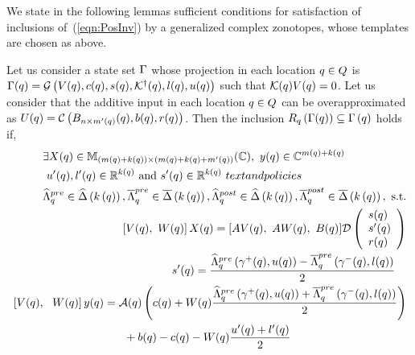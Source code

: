 We state in the following lemmas sufficient conditions for satisfaction of inclusions
of~(\ref{eqn:PosInv}) by a generalized complex zonotopes,
whose templates are chosen as above.
\begin{lemma}
  Let us consider a state set $\Gamma$ whose projection in each
  location $q\in Q$ is $\Gamma(q) =
  \mathcal{G}\left(V(q),c(q),s(q),\mathcal{K}^\dagger(q),l(q),u(q)\right)$
  such that $\mathcal{K}(q)V(q) = 0$.  Let us consider that the
  additive input in each location $q\in Q$ can be
  overapproximated as $U(q) = \mathcal{C}\left(B_{n\times
      m^\prime(q)}(q),b(q),r(q)\right)$.  Then the inclusion
  $R_{q}\left(\Gamma(q)\right) \subseteq
  \Gamma\left(q\right)$ holds if,
\begin{align}
\begin{split}
& \exists
  X(\loc)\in\mat{\lt(m(\loc)+k(\loc)\rt)}{\lt(m(\loc)+k(\loc)+m^\pr(\loc)\rt)}{\mb{C}},~
  y(\loc)\in\mb{C}^{m(\loc)+k(\loc)}\\&~u^\pr(\loc),l^\pr(\loc)\in\realset^{k(\loc)}~\text{and}~s^\pr(\loc)\in\realset^{k(\loc)}~text{and policies}\\
&\minaffinefunc_{\loc}^{pre}\in\minaffineset\lt(k\lt(\loc\rt)\rt),\maxaffinefunc_{\loc}^{pre}\in\maxaffineset\lt(k\lt(\loc\rt)\rt),
\minaffinefunc_{\loc}^{post}\in\minaffineset\lt(k\lt(\loc\rt)\rt),\maxaffinefunc_{\loc}^{post}\in\maxaffineset\lt(k\lt(\loc\rt)\rt),~\text{s.t.}
\end{split}\\
\begin{split}
& \left[V(\loc),~W(\loc)\rt]X(\loc) =
  [AV(\loc),~AW(\loc),~B(\loc)]\dg\lt(\cjoin{s(\loc)}{s^\pr(\loc)}{r(\loc)}\rt)\\
\end{split}\\
\begin{split}
& s^\pr(\loc) = \frac{\minaffinefunc_{\loc}^{pre}\lt(\stay^+(\loc),u(\loc)\rt)
      -\maxaffinefunc_{\loc}^{pre}\lt(\stay^-(\loc),l(\loc)\rt)}{2}
\end{split}\\
\begin{split}
  & \left[V(\loc),~~W(\loc)\rt]y(\loc) = 
    \map(\loc)\lt(c(\loc)+W(\loc)\frac{\minaffinefunc_{\loc}^{pre}\lt(\stay^+(\loc),u(\loc)\rt)
     +\maxaffinefunc_{\loc}^{pre}\lt(\stay^-(\loc),l(\loc)\rt)}{2}\rt)\\ & \hspace{10em} +
  b(\loc)-c(\loc)-W(\loc)\frac{u^\pr(\loc)+l^\pr(\loc)}{2}

\end{split}
\end{align}
\end{lemma}

